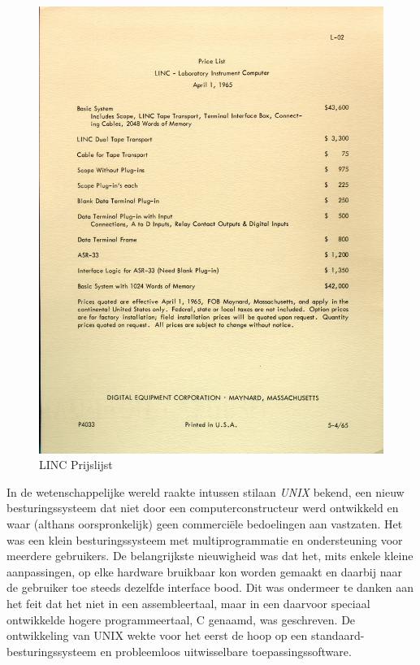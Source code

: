 \begin{figure}
\begin{center}
\includegraphics[width=\textwidth]{images/linc02.jpg}
\end{center}
\caption{LINC Prijslijst}
\label{linc_prijs}
\end{figure}

In de wetenschappelijke wereld raakte intussen stilaan
\emph{UNIX} bekend, een nieuw besturingssysteem dat
niet door een computerconstructeur werd ontwikkeld en waar (althans
oorspronkelijk) geen commerci\"ele bedoelingen aan vastzaten. Het was
een klein besturingssysteem met multiprogrammatie en ondersteuning
voor meerdere gebruikers. De belangrijkste nieuwigheid was dat het,
mits enkele kleine aanpassingen, op elke hardware bruikbaar kon worden
gemaakt en daarbij naar de gebruiker toe steeds dezelfde interface
bood. Dit was ondermeer te danken aan het feit dat het niet in een
assembleertaal, maar in een daarvoor speciaal ontwikkelde hogere
programmeertaal, C genaamd, was geschreven. De ontwikkeling van UNIX
wekte voor het eerst de hoop op een standaard-besturingssysteem en
probleemloos uitwisselbare toepassingssoftware.

